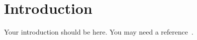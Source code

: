 \section{Introduction} 

Your introduction should be here. You may need a reference~\cite{Lee:2018}.



\newpage